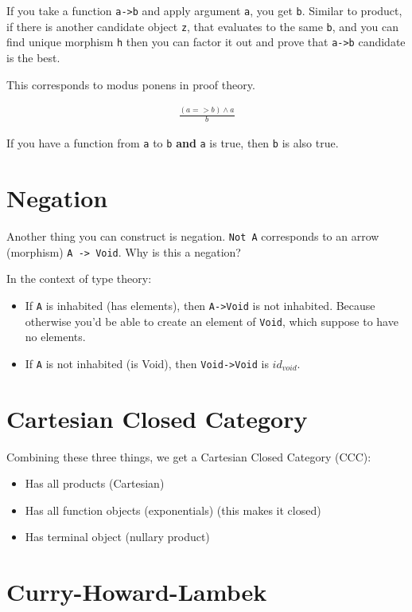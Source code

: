 \documentclass[11pt]{article}
\begin{document}
If you take a function \texttt{a->b} and apply argument \texttt{a}, you get \texttt{b}. Similar to product, if there is another candidate object \texttt{z}, that evaluates to the same \texttt{b}, and you can find unique morphism \texttt{h} then you can factor it out and prove that \texttt{a->b} candidate is the best.

This corresponds to modus ponens in proof theory.

\begin{eqnarray}
\frac{(a=>b) \wedge a}{b}
\end{eqnarray}

If you have a function from \texttt{a} to \texttt{b} \textbf{and} \texttt{a} is true, then \texttt{b} is also true.

\section{Negation}
\label{sec:org6a533b2}

Another thing you can construct is negation. \texttt{Not A} corresponds to an arrow (morphism) \texttt{A -> Void}. Why is this a negation?

In the context of type theory:

\begin{itemize}
\item If \texttt{A} is inhabited (has elements), then \texttt{A->Void} is not inhabited. Because otherwise you'd be able to create an element of \texttt{Void}, which suppose to have no elements.
\item If \texttt{A} is not inhabited (is Void), then \texttt{Void->Void} is \(id_{void}\).
\end{itemize}

\section{Cartesian Closed Category}
\label{sec:org953cc8b}

Combining these three things, we get a Cartesian Closed Category (CCC):
\begin{itemize}
\item Has all products (Cartesian)
\item Has all function objects (exponentials) (this makes it closed)
\item Has terminal object (nullary product)
\end{itemize}

\section{Curry-Howard-Lambek}
\label{sec:org5b2cb02}
\end{document}
